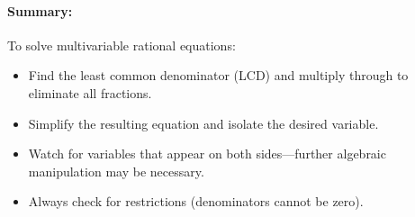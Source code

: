 \documentclass[11pt]{article}
\begin{document}
\paragraph{Summary:}
To solve multivariable rational equations:
\begin{itemize}
  \item Find the least common denominator (LCD) and multiply through to eliminate all fractions.
  \item Simplify the resulting equation and isolate the desired variable.
  \item Watch for variables that appear on both sides—further algebraic manipulation may be necessary.
  \item Always check for restrictions (denominators cannot be zero).
\end{itemize}
\end{document}
